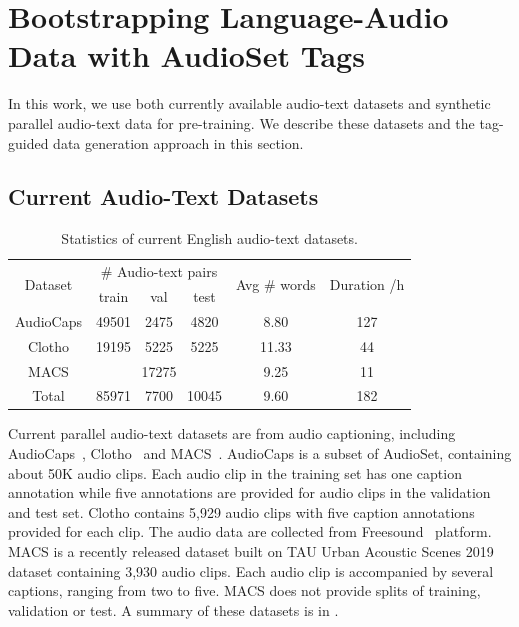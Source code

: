 \documentclass[sigconf]{acmart}
\begin{document}
\section{Bootstrapping Language-Audio Data with AudioSet Tags}
In this work, we use both currently available audio-text datasets and synthetic parallel audio-text data for pre-training.
We describe these datasets and the tag-guided data generation approach in this section. 

\subsection{Current Audio-Text Datasets}
\label{subsec:real_datasets}

\begin{table}[ht]
    \centering
    \begin{tabular}{c||ccc|c|c}
    \toprule
    \multirow{2}{*}{Dataset} & \multicolumn{3}{c|}{\# Audio-text pairs} & \multirow{2}{*}{Avg \# words} & \multirow{2}{*}{Duration /h} \\
    \cline{2-4}
     & train & val & test & & \\
    \midrule
    AudioCaps & 49501 & 2475 & 4820 & 8.80 & 127\\
    \hline
    Clotho & 19195 & 5225 & 5225 & 11.33 & 44\\
    \hline
    MACS & \multicolumn{3}{c|}{17275} & 9.25 & 11\\
    \midrule
    Total & 85971 & 7700 & 10045 & 9.60 & 182\\
    \bottomrule
    \end{tabular}
    \caption{Statistics of current English audio-text datasets.}
    \label{tab:real_datasets}
\end{table}

Current parallel audio-text datasets are from audio captioning, including AudioCaps~\cite{kim2019audiocaps}, Clotho~\cite{drossos2020clotho} and MACS~\cite{martin2021diversity}.
AudioCaps is a subset of AudioSet, containing about 50K audio clips.
Each audio clip in the training set has one caption annotation while five annotations are provided for audio clips in the validation and test set.
Clotho contains 5,929 audio clips with five caption annotations provided for each clip.
The audio data are collected from Freesound~\cite{font2013freesound} platform.
MACS is a recently released dataset built on TAU Urban Acoustic Scenes 2019 dataset containing 3,930 audio clips.
Each audio clip is accompanied by several captions, ranging from two to five.
MACS does not provide splits of training, validation or test.
A summary of these datasets is in .
\end{document}
